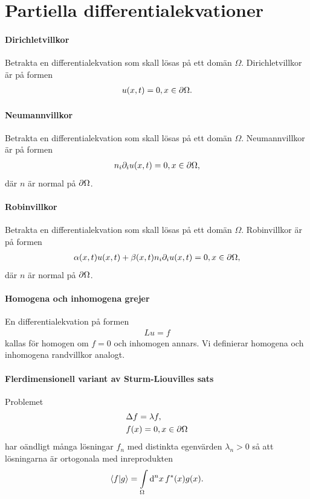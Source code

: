 \section{Partiella differentialekvationer}

\paragraph{Dirichletvillkor}
Betrakta en differentialekvation som skall lösas på ett domän $\Omega$. Dirichletvillkor är på formen 
\begin{align*}
	u(x, t) = 0, x\in\partial \Omega.
\end{align*}

\paragraph{Neumannvillkor}
Betrakta en differentialekvation som skall lösas på ett domän $\Omega$. Neumannvillkor är på formen
\begin{align*}
	n_{i}\partial_{i}u(x, t) = 0, x\in\partial \Omega,
\end{align*}
där $n$ är normal på $\partial \Omega$.

\paragraph{Robinvillkor}
Betrakta en differentialekvation som skall lösas på ett domän $\Omega$. Robinvillkor är på formen
\begin{align*}
	\alpha(x, t)u(x, t) + \beta(x, t)n_{i}\partial_{i}u(x, t) = 0, x\in\partial \Omega,
\end{align*}
där $n$ är normal på $\partial \Omega$.

\paragraph{Homogena och inhomogena grejer}
En differentialekvation på formen
\begin{align*}
	Lu = f
\end{align*}
kallas för homogen om $f = 0$ och inhomogen annars. Vi definierar homogena och inhomogena randvillkor analogt.

\paragraph{Flerdimensionell variant av Sturm-Liouvilles sats}
Problemet
\begin{align*}
	&\Delta f = \lambda f, \\
	&f(x) = 0, x\in\partial \Omega
\end{align*}
har oändligt många lösningar $f_{n}$ med distinkta egenvärden $\lambda_{n} > 0$ så att lösningarna är ortogonala med inreprodukten
\begin{align*}
	\bra{f}\ket{g} = \int\limits_{\Omega}\dd[n]{x}f^{*}(x)g(x).
\end{align*}

